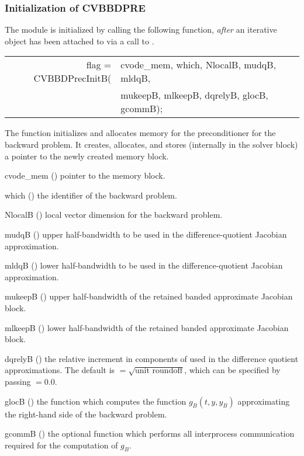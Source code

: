 \subsubsection{Initialization of CVBBDPRE}
The {\cvbbdpre} module is initialized by calling the following function,
{\em after} an iterative {\sunlinsol} object has been
attached to {\cvodes} via a call to .
{
  \begin{tabular}[t]{@{}r@{}l@{}}
    flag = CVBBDPrecInitB(&cvode\_mem, which, NlocalB, mudqB, mldqB,\\
                          &mukeepB, mlkeepB, dqrelyB, glocB, gcommB);
  \end{tabular}
}
{
  The function  initializes and allocates
  memory for the {\cvbbdpre} preconditioner for the backward problem.
  It creates, allocates, and stores (internally in the {\cvodes} solver
  block) a pointer to the newly created {\cvbbdpre} memory block.
}
{
  \begin{args}
  \item[cvode\_mem] ()
    pointer to the {\cvodes} memory block.
  \item[which] ()
    the identifier of the backward problem.
  \item[NlocalB] ()
    local vector dimension for the backward problem.
  \item[mudqB] ()
    upper half-bandwidth to be used in the difference-quotient Jacobian approximation.
  \item[mldqB] ()
    lower half-bandwidth to be used in the difference-quotient Jacobian approximation.
  \item[mukeepB] ()
    upper half-bandwidth of the retained banded approximate Jacobian block.
  \item[mlkeepB] ()
    lower half-bandwidth of the retained banded approximate Jacobian block.
  \item[dqrelyB] ()
    the relative increment in components of  used in the difference quotient
    approximations.  The default is $ = \sqrt{\text{unit roundoff}}$, which
    can be specified by passing $ = 0.0$.
  \item[glocB] ()
    the function which computes the function $g_B(t,y,y_B)$ approximating
    the right-hand side of the backward problem.
  \item[gcommB] ()
    the optional function which performs all interprocess communication required for
    the computation of $g_B$.
  \end{args}
}
